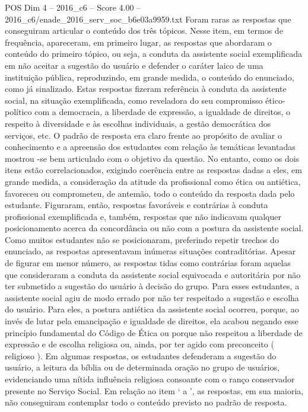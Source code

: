 \begin{textsample}{POS Dim 4 – 2016\_c6 – Score 4.00 – 2016\_c6/enade\_2016\_serv\_soc\_b6e03a9959.txt}
Foram raras as respostas que conseguiram articular o conteúdo dos três tópicos.
Nesse item, em termos de frequência, apareceram, em primeiro lugar, as respostas que abordaram o conteúdo do primeiro tópico, ou seja, a conduta da assistente social exemplificada em não aceitar a sugestão do usuário e defender o caráter laico de uma instituição pública, reproduzindo, em grande medida, o conteúdo do enunciado, como já sinalizado.
Estas respostas fizeram referência à conduta da assistente social, na situação exemplificada, como reveladora do seu compromisso ético-político com a democracia, a liberdade de expressão, a igualdade de direitos, o respeito à diversidade e às escolhas individuais, a gestão democrática dos serviços, etc.
O padrão de resposta era claro frente ao propósito de avaliar o conhecimento e a apreensão dos estudantes com relação às temáticas levantadas mostrou -se bem articulado com o objetivo da questão.
No entanto, como os dois itens estão correlacionados, exigindo coerência entre as respostas dadas a eles, em grande medida, a consideração da atitude da profissional como ética ou antiética, favoreceu ou comprometeu, de antemão, todo o conteúdo da resposta dada pelo estudante.
Figuraram, então, respostas favoráveis e contrárias à conduta profissional exemplificada e, também, respostas que não indicavam qualquer posicionamento acerca da concordância ou não com a postura da assistente social.
Como muitos estudantes não se posicionaram, preferindo repetir trechos do enunciado, as respostas apresentavam inúmeras situações contraditórias.
Apesar de figurar em menor número, as respostas tidas como contrárias foram aquelas que consideraram a conduta da assistente social equivocada e autoritária por não ter submetido a sugestão do usuário à decisão do grupo.
Para esses estudantes, a assistente social agiu de modo errado por não ter respeitado a sugestão e escolha do usuário.
Para eles, a postura antiética da assistente social ocorreu, porque, ao invés de lutar pela emancipação e igualdade de direitos, ela acabou negando esse princípio fundamental do Código de Ética ou porque não respeitou a liberdade de expressão e de escolha religiosa ou, ainda, por ter agido com preconceito ( religioso ).
Em algumas respostas, os estudantes defenderam a sugestão do usuário, a leitura da bíblia ou de determinada oração no grupo de usuários, evidenciando uma nítida influência religiosa consoante com o ranço conservador presente no Serviço Social.
Em relação ao item ‘ a ’, as respostas, em sua maioria, não conseguiram contemplar todo o conteúdo previsto no padrão de resposta.

\end{textsample}
